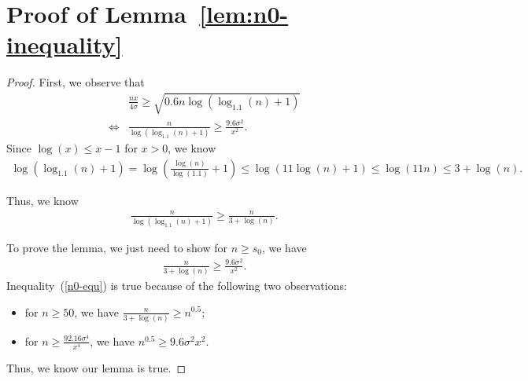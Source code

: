 \section{Proof of Lemma~\ref{lem:n0-inequality}}
\label{sec:n0-inequality-proof}

\begin{proof}
First, we observe that
\begin{align}
&\frac{nx}{4\sigma}\geq \sqrt{0.6n\log(\log_{1.1}(n)+1)} \nonumber \\
\iff &\frac{n}{\log(\log_{1.1}(n)+1)}\geq \frac{9.6\sigma^2}{x^2}. \nonumber 
\end{align}
Since $\log(x)\leq x-1$ for $x>0$, we know 
\begin{align}
\log(\log_{1.1}(n)+1)=\log\left(\frac{\log(n)}{\log(1.1)}+1\right)\leq \log(11\log(n)+1)\leq \log(11n)\leq 3+\log(n). \nonumber
\end{align}

Thus, we know
\begin{align}
\frac{n}{\log(\log_{1.1}(n)+1)}\geq \frac{n}{3+\log(n)}. \nonumber 
\end{align}

To prove the lemma, we just need to show for $n\geq s_{0}$, we have
\begin{align}
\frac{n}{3+\log(n)}\geq \frac{9.6\sigma^2}{x^2}. \label{n0-equ}
\end{align}
Inequality~(\ref{n0-equ}) is true because of the following two observations:
\begin{itemize}
\item for $n\geq 50$, we have $\frac{n}{3+\log(n)}\geq n^{0.5}$;
\item for $n\geq \frac{92.16\sigma^4}{x^4}$, we have $n^{0.5}\geq {9.6\sigma^{2}}{x^{2}}$.
\end{itemize}

Thus, we know our lemma is true.
\end{proof}